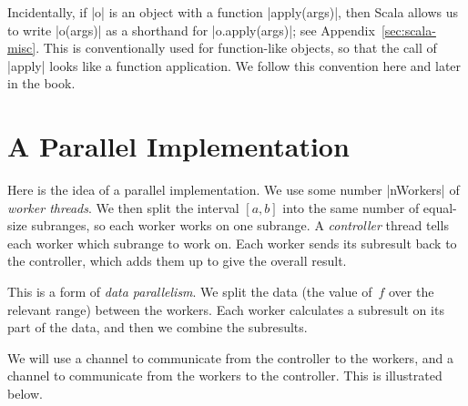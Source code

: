 Incidentally, if |o| is an object with a function |apply(args)|, then Scala
allows us to write |o(args)| as a shorthand for |o.apply(args)|; see
Appendix~\ref{sec:scala-misc}.  This is conventionally used for function-like
objects, so that the call of |apply| looks like a function application.  We
follow this convention here and later in the book.


\section{A Parallel Implementation}

Here is the idea of a parallel implementation.  We use some number |nWorkers|
of \emph{worker threads}.  We then split the interval
$[a,b]$ into the same number of equal-size subranges, so each worker works on
one subrange.  A \emph{controller} thread tells each worker
which subrange to work on.  Each worker sends its subresult back to the
controller, which adds them up to give the overall result.

This is a form of \emph{data parallelism}.  We split
the data (the value of~$f$ over the relevant range) between the workers.  Each
worker calculates a subresult on its part of the data, and then we combine the
subresults.


We will use a channel  to communicate from the
controller to the workers, and a channel 
to communicate from the workers to the controller.  This is illustrated below.
%
\begin{center}
\end{center}


